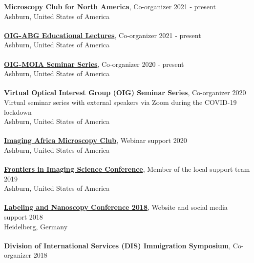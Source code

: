 \documentclass[margin,line]{res}
\begin{document}
\begin{resume}
{\bf Microscopy Club for North America}, Co-organizer \hfill {2021 - present}\\
Ashburn, United States of America\\
\vspace*{-3mm}\\
{\bf \href{https://www.janelia.org/content/optical-interest-group}{OIG-ABG Educational Lectures}}, Co-organizer \hfill {2021 - present}\\
Ashburn, United States of America\\
\vspace*{-3mm}\\
{\bf \href{https://www.janelia.org/content/optical-interest-group}{OIG-MOIA Seminar Series}}, Co-organizer \hfill {2020 - present}\\
Ashburn, United States of America\\
\vspace*{-3mm}\\
{\bf Virtual Optical Interest Group (OIG) Seminar Series}, Co-organizer \hfill {2020}\\
Virtual seminar series with external speakers via Zoom during the COVID-19 lockdown\\
Ashburn, United States of America\\
\vspace*{-3mm}\\
{\bf \href{https://www.imagingafrica.org/}{Imaging Africa Microscopy Club}}, Webinar support \hfill {2020}\\
Ashburn, United States of America\\
\vspace*{-3mm}\\
{\bf \href{https://www.janelia.org/you-janelia/conferences/frontiers-in-imaging-science-ii}{ Frontiers in Imaging Science Conference}}, Member of the local support team \hfill {2019}\\
Ashburn, United States of America\\
\vspace*{-3mm}\\
{\bf \href{https://labeling-and-nanoscopy.de/}{Labeling and Nanoscopy Conference 2018}}, Website and social media support \hfill {2018}\\
Heidelberg, Germany\\
\vspace*{-3mm}\\
{\bf Division of International Services (DIS) Immigration Symposium}, Co-organizer  \hfill {2018}\\

\end{resume}
\end{document}
